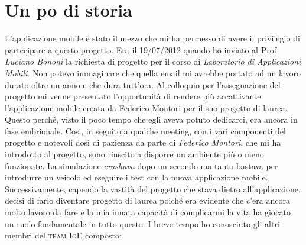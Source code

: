 \section{Un po di storia}\label{sec:unpodistoria}

L'applicazione mobile è stato il mezzo che mi ha permesso di avere il privilegio di partecipare a questo progetto. Era il 19/07/2012 quando ho inviato al Prof \emph{Luciano Bononi} la richiesta di progetto per il corso di \emph{Laboratorio di Applicazioni Mobili}. Non potevo immaginare che quella email mi avrebbe portato ad un lavoro durato oltre un anno e che dura tutt'ora.
Al colloquio per l'assegnazione del progetto mi venne presentato l'opportunità di rendere più accattivante l'applicazione mobile creata da Federico Montori per il suo progetto di laurea. Questo perché, visto il poco tempo che egli aveva potuto dedicarci, era ancora in fase embrionale.
Cosi, in seguito a qualche meeting, con i vari componenti del progetto e notevoli dosi di pazienza da parte di \emph{Federico Montori}, che mi ha introdotto al progetto, sono riuscito a disporre un ambiente più o meno funzionate. La simulazione \emph{crashava} dopo un secondo ma tanto bastava per introdurre un veicolo ed eseguire i test con la nuova applicazione mobile.
Successivamente, capendo la vastità del progetto che stava dietro all'applicazione, decisi di farlo diventare progetto di laurea poiché era evidente che c'era ancora molto lavoro da fare e la mia innata capacità di complicarmi la vita ha giocato un ruolo fondamentale in tutto questo.
I  breve tempo ho conosciuto gli altri membri del \textsc{team IoE} composto:
